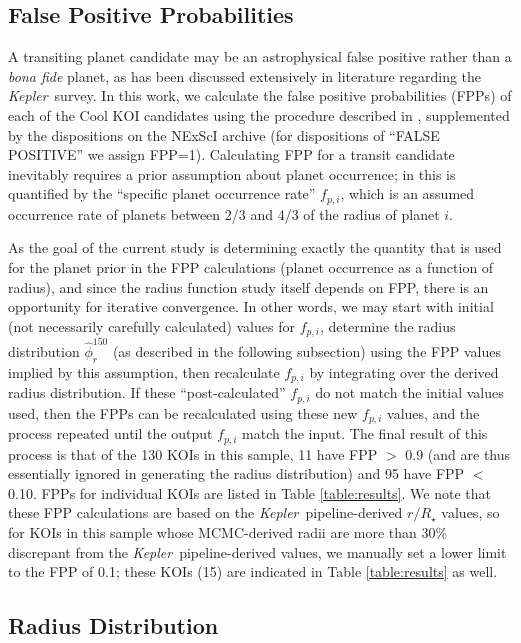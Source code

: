 \documentclass[iop]{emulateapj}
\def\Kepler{\textit{Kepler}}
\def\Pmax{150}
\begin{document}
\subsection{False Positive Probabilities}
\label{sec:fpp}

A transiting planet candidate may be an astrophysical false positive rather than a  \textit{bona fide} planet, as has been discussed extensively in literature regarding the \Kepler\ survey.  In this work, we calculate the false positive probabilities (FPPs) of each of the Cool KOI candidates using the procedure described in \citet{morton2012}, supplemented by the dispositions on the NExScI archive (for dispositions of ``FALSE POSITIVE'' we assign FPP=1).  Calculating FPP for a transit candidate inevitably requires a prior assumption about planet occurrence; in \citet{morton2012} this is quantified by the ``specific planet occurrence rate'' $f_{p,i}$, which is an assumed occurrence rate of planets between 2/3 and 4/3 of the radius of planet $i$.  

As the goal of the current study is determining exactly the quantity that is used for the planet prior in the FPP calculations (planet occurrence as a function of radius), and since the radius function study itself depends on FPP, there is an opportunity for  iterative convergence.  In other words, we may start with initial (not necessarily carefully calculated) values for $f_{p,i}$, determine the radius distribution $\hat\phi_r^{\Pmax}$ (as described in the following subsection) using the FPP values implied by this assumption, then recalculate $f_{p,i}$ by integrating over the derived radius distribution.  If these ``post-calculated'' $f_{p,i}$ do not match the initial values used, then the FPPs can be recalculated using these new $f_{p,i}$ values, and the process repeated until the output $f_{p,i}$ match the input.  The final result of this process is that of the 130 KOIs in this sample, 11 have FPP $>$ 0.9 (and are thus essentially ignored in generating the radius distribution) and 95 have FPP $<$ 0.10.  FPPs for individual KOIs are listed in Table \ref{table:results}.  We note that these FPP calculations are based on the \Kepler\ pipeline-derived $r/R_\star$ values, so for KOIs in this sample whose MCMC-derived radii are more than 30\% discrepant from the \Kepler\ pipeline-derived values, we manually set a lower limit to the FPP of 0.1; these KOIs (15) are indicated in Table \ref{table:results} as well.


\subsection{Radius Distribution}
\label{sec:rdist}
\end{document}
